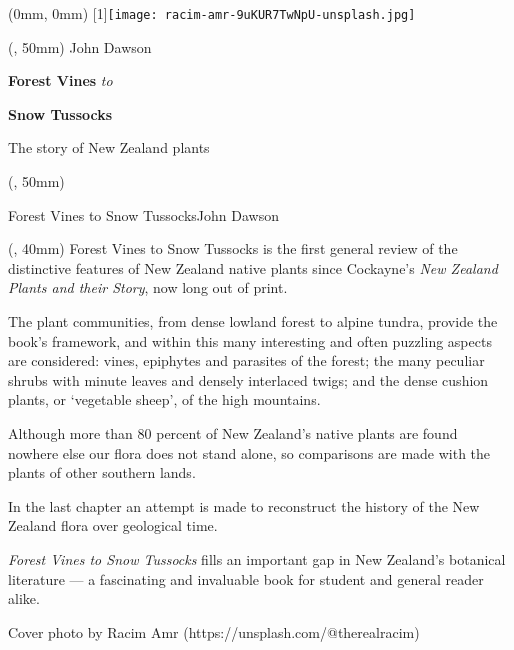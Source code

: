 \documentclass{article}
\newlength{\frontcoverwidth}
\newlength{\frontcoveroffset}
\newlength{\backcoverwidth}
\newlength{\backcoveroffset}
\newlength{\spineoffset}
\begin{document}
	\color{white}%
	\sffamily%
	\begin{textblock*}{\paperwidth} (0mm, 0mm)
		\scalebox{-1}[1]{\texttt{[image: racim-amr-9uKUR7TwNpU-unsplash.jpg]}}
	\end{textblock*}

	\begin{textblock*}{\frontcoverwidth} (\frontcoveroffset, 50mm) %
		\fontsize{28}{33}\selectfont%
		John Dawson\par
		\vspace{12em}%
		\raggedleft%
		\fontsize{44}{52}\selectfont%
		\textbf{Forest Vines}\emph{ to}\par
		\textbf{Snow Tussocks}\par
		\vspace{0.5em}
		\fontsize{28}{33}\selectfont%
		The story of New Zealand plants
	\end{textblock*}

	\begin{textblock*}{1pt} (\spineoffset-9pt, 50mm)
		\centering%
		\begin{rotate}{-90}
			\fontsize{22}{22}\selectfont%
			Forest Vines to Snow Tussocks\hspace{8em}John Dawson
		\end{rotate}
	\end{textblock*}

	\begin{textblock*}{\backcoverwidth} (\backcoveroffset, 40mm)
		\Large\centering%
		\setlength{\parskip}{1em}%
		Forest Vines to Snow Tussocks is the first general review of the distinctive features of New Zealand native plants since Cockayne's \emph{New Zealand Plants and their Story}, now long out of print.

		The plant communities, from dense lowland forest to alpine tundra, provide the book's framework, and within this many interesting and often puzzling aspects are considered: vines, epiphytes and parasites of the forest; the many peculiar shrubs with minute leaves and densely interlaced twigs; and the dense cushion plants, or `vegetable sheep', of the high mountains.

		Although more than 80 percent of New Zealand's native plants are found nowhere else our flora does not stand alone, so comparisons are made with the plants of other southern lands.

		In the last chapter an attempt is made to reconstruct the history of the New Zealand flora over geological time.

		\emph{Forest Vines to Snow Tussocks} fills an important gap in New Zealand's botanical literature — a fascinating and invaluable book for student and general reader alike.
		
		\vspace{7em}%
		{\small Cover photo by Racim Amr (https://unsplash.com/@therealracim)}
	\end{textblock*}
\end{document}
